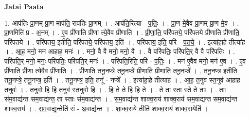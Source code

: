 \documentclass[17pt]{extarticle}
\begin{document}
\textbf{Jatai Paata} \newline

1. आप॑तिः प्रा॒णम् प्रा॒ण माप॑ति॒ राप॑तिः प्रा॒णम् । . आप॑ति॒रित्या - प॒तिः॒ । . प्रा॒ण मे॒वैव प्रा॒णम् प्रा॒ण मे॒व । . प्रा॒णमिति॑ प्र - अ॒नम् । . ए॒व प्री॑णाति प्रीणा त्ये॒वैव प्री॑णाति । . प्री॒णा॒ति॒ परि॑पतये॒ परि॑पतये प्रीणाति प्रीणाति॒ परि॑पतये । . परि॑पतय॒ इतीति॒ परि॑पतये॒ परि॑पतय॒ इति॑ । . परि॑पतय॒ इति॒ परि॑ - प॒त॒ये॒ । . इत्या॑हा॒हे तीत्या॑ह । . आ॒ह॒ मनो॒ मन॑ आहाह॒ मनः॑ । . मनो॒ वै वै मनो॒ मनो॒ वै । . वै परि॑पतिः॒ परि॑पति॒र् वै वै परि॑पतिः । . परि॑पति॒र् मनो॒ मनः॒ परि॑पतिः॒ परि॑पति॒र् मनः॑ । . परि॑पति॒रिति॒ परि॑ - प॒तिः॒ । . मन॑ ए॒वैव मनो॒ मन॑ ए॒व । . ए॒व प्री॑णाति प्रीणा त्ये॒वैव प्री॑णाति । . प्री॒णा॒ति॒ तनू॒नप्त्रे॒ तनू॒नप्त्रे᳚ प्रीणाति प्रीणाति॒ तनू॒नप्त्रे᳚ । . तनू॒नप्त्र॒ इतीति॒ तनू॒नप्त्रे॒ तनू॒नप्त्र॒ इति॑ । . तनू॒नप्त्र॒ इति॒ तनू᳚ - नप्त्रे᳚ । . इत्या॑हा॒हे तीत्या॑ह । . आ॒ह॒ त॒नुव॑ स्त॒नुव॑ आहाह त॒नुवः॑ । . त॒नुवो॒ हि हि त॒नुव॑ स्त॒नुवो॒ हि । . हि ते ते हि हि ते । . ते ता स्ता स्ते ते ताः । . ताः स॑म॒वाद्य॑न्त सम॒वाद्य॑न्त॒ ता स्ताः स॑म॒वाद्य॑न्त । . स॒म॒वाद्य॑न्त शाक्व॒राय॑ शाक्व॒राय॑ सम॒वाद्य॑न्त सम॒वाद्य॑न्त शाक्व॒राय॑ । . स॒म॒वाद्य॒न्तेति॑ सं - अ॒वाद्य॑न्त । . शा॒क्व॒राये तीति॑ शाक्व॒राय॑ शाक्व॒रायेति॑ । \newline
\end{document}
